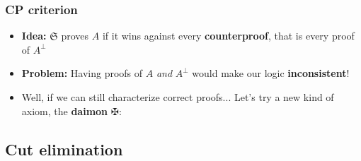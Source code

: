 \documentclass[usenames,dvipsnames]{beamer}
\newcommand{\dai}{✠}
\newcommand{\seq}{\vdash}
\newcommand{\irule}[1]{\footnotesize$#1$}
\begin{document}
\begin{frame}
    \frametitle{\textrm{CP} criterion}
    \begin{itemize}
        \setlength\itemsep{1em}
        \item \textbf{Idea:} $\mathfrak{S}$ proves $A$ if it wins against every
        \textbf{counterproof}, that is every proof of $A^\bot$
        \item \textbf{Problem:} Having proofs of $A$ \emph{and} $A^\bot$ would make our logic
        \textbf{inconsistent}!
        \item Well, if we can still characterize correct proofs... Let's try a new kind of
        axiom, the \textbf{daimon} $\dai$:
        \vspace{-2em}
    \end{itemize}
\end{frame}

\subsection{Cut elimination}
\end{document}
